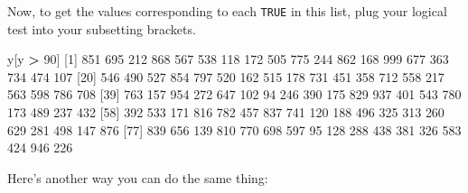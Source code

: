\documentclass[]{book}
\newenvironment{Shaded}{\begin{snugshade}}{\end{snugshade}}
\newcommand{\DecValTok}[1]{\textcolor[rgb]{0.00,0.00,0.81}{#1}}
\newcommand{\NormalTok}[1]{#1}
\newcommand{\OperatorTok}[1]{\textcolor[rgb]{0.81,0.36,0.00}{\textbf{#1}}}
\newcommand{\StringTok}[1]{\textcolor[rgb]{0.31,0.60,0.02}{#1}}
\begin{document}
Now, to get the values corresponding to each \texttt{TRUE} in this list, plug your logical test into your subsetting brackets.

\begin{Shaded}
\begin{Highlighting}[]
\NormalTok{y[y }\OperatorTok{>}\StringTok{ }\DecValTok{90}\NormalTok{]}
\NormalTok{ [}\DecValTok{1}\NormalTok{] }\DecValTok{851} \DecValTok{695} \DecValTok{212} \DecValTok{868} \DecValTok{567} \DecValTok{538} \DecValTok{118} \DecValTok{172} \DecValTok{505} \DecValTok{775} \DecValTok{244} \DecValTok{862} \DecValTok{168} \DecValTok{999} \DecValTok{677} \DecValTok{363} \DecValTok{734} \DecValTok{474} \DecValTok{107}
\NormalTok{[}\DecValTok{20}\NormalTok{] }\DecValTok{546} \DecValTok{490} \DecValTok{527} \DecValTok{854} \DecValTok{797} \DecValTok{520} \DecValTok{162} \DecValTok{515} \DecValTok{178} \DecValTok{731} \DecValTok{451} \DecValTok{358} \DecValTok{712} \DecValTok{558} \DecValTok{217} \DecValTok{563} \DecValTok{598} \DecValTok{786} \DecValTok{708}
\NormalTok{[}\DecValTok{39}\NormalTok{] }\DecValTok{763} \DecValTok{157} \DecValTok{954} \DecValTok{272} \DecValTok{647} \DecValTok{102}  \DecValTok{94} \DecValTok{246} \DecValTok{390} \DecValTok{175} \DecValTok{829} \DecValTok{937} \DecValTok{401} \DecValTok{543} \DecValTok{780} \DecValTok{173} \DecValTok{489} \DecValTok{237} \DecValTok{432}
\NormalTok{[}\DecValTok{58}\NormalTok{] }\DecValTok{392} \DecValTok{533} \DecValTok{171} \DecValTok{816} \DecValTok{782} \DecValTok{457} \DecValTok{837} \DecValTok{741} \DecValTok{120} \DecValTok{188} \DecValTok{496} \DecValTok{325} \DecValTok{313} \DecValTok{260} \DecValTok{629} \DecValTok{281} \DecValTok{498} \DecValTok{147} \DecValTok{876}
\NormalTok{[}\DecValTok{77}\NormalTok{] }\DecValTok{839} \DecValTok{656} \DecValTok{139} \DecValTok{810} \DecValTok{770} \DecValTok{698} \DecValTok{597}  \DecValTok{95} \DecValTok{128} \DecValTok{288} \DecValTok{438} \DecValTok{381} \DecValTok{326} \DecValTok{583} \DecValTok{424} \DecValTok{946} \DecValTok{226}
\end{Highlighting}
\end{Shaded}

Here's another way you can do the same thing:
\end{document}
